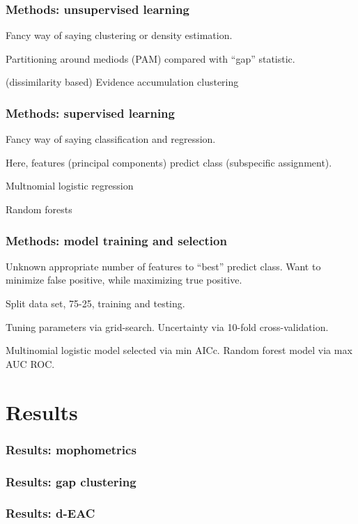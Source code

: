 \documentclass{beamer}\usepackage{graphicx, color}
\begin{document}
\begin{frame}
  \frametitle{Methods: unsupervised learning}

  Fancy way of saying clustering or density estimation.

  Partitioning around mediods (PAM) compared with ``gap'' statistic.

  (dissimilarity based) Evidence accumulation clustering
\end{frame}

\begin{frame}
  \frametitle{Methods: supervised learning}

  Fancy way of saying classification and regression.

  Here, features (principal components) predict class (subspecific assignment).

  Multnomial logistic regression

  Random forests
\end{frame}

\begin{frame}
  \frametitle{Methods: model training and selection}
  Unknown appropriate number of features to ``best'' predict class. Want to minimize false positive, while maximizing true positive.

  Split data set, 75-25, training and testing.

  Tuning parameters via grid-search. Uncertainty via 10-fold cross-validation.

  Multinomial logistic model selected via min AICc. Random forest model via max AUC ROC.

\end{frame}


\section{Results}
\begin{frame}
  \frametitle{Results: mophometrics}


\end{frame}

\begin{frame}
  \frametitle{Results: gap clustering}


\end{frame}

\begin{frame}
  \frametitle{Results: d-EAC}

\end{frame}
\end{document}
